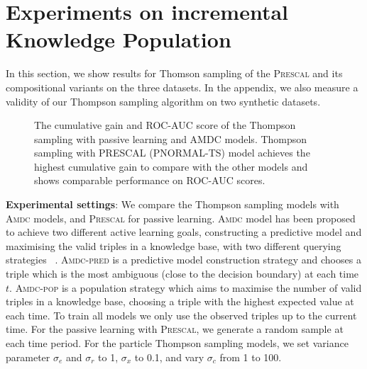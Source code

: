 
\section{Experiments on incremental\\ Knowledge Population}
\label{sec:exp2}

In this section, we show results for Thomson sampling of the \textsc{Prescal} and its compositional variants on the three datasets. In the appendix, we also measure a validity of our Thompson sampling algorithm on two synthetic datasets.

\begin{figure*}[t]
	\centering

	\caption{\label{fig:vs_greedy} The cumulative gain and ROC-AUC score of the Thompson sampling with passive learning and  AMDC models. Thompson sampling with PRESCAL (\textsc{PNORMAL-TS}) model achieves the highest cumulative gain to compare with the other models and shows comparable performance on ROC-AUC scores.}
\end{figure*}

%

\textbf{Experimental settings}:
We compare the Thompson sampling models with \textsc{Amdc} models, and \textsc{Prescal} for passive learning.
\textsc{Amdc} model has been proposed to achieve two different active learning goals, constructing a predictive
model and maximising the valid triples in a knowledge base, with two different querying strategies
~\cite{kajino2015active}.
\textsc{Amdc-pred} is a predictive model construction strategy and chooses a triple which is the most ambiguous (close to the decision boundary) at each time $t$.
\textsc{Amdc-pop} is a population strategy which aims to maximise the number of valid triples in a knowledge base, choosing a triple with the highest expected value at each time.
To train all models we only use the observed triples up to the current time.
For the passive learning with \textsc{Prescal}, we generate a random sample at each time period.
For the particle Thompson sampling models, we set variance parameter $\sigma_e$ and $\sigma_r$ to 1, $\sigma_x$ to 0.1, and vary $\sigma_c$ from 1 to 100.

